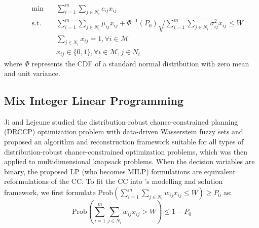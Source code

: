 \documentclass[lettersize,journal]{IEEEtran}
\begin{document}
\begin{subequations}
    \begin{align}
    & & \min \quad       &\sum\limits_{i=1}^m\sum\limits_{j\in N_i} c_{ij} x_{ij}    \\
    & & \text{s.t.}\quad &\sum\limits_{i=1}^m\sum\limits_{j\in N_i} \mu_{ij} x_{ij} + \Phi^{-1}(P_0)\sqrt{\sum\limits_{i=1}^m\sum\limits_{j\in N_i} \sigma^2_{ij} x_{ij}}\leq W\\
    & &                  &\sum\limits_{j\in N_i}x_{ij}=1, \forall i \in \mathcal{M}\\
    & &                  &x_{ij}\in \{0,1\},\forall i \in \mathcal{M}, j\in N_i 
    \end{align}
    \label{formu_RAMCKP}
\end{subequations}
where $\Phi$ represents the CDF of a standard normal distribution with zero mean and unit variance.

\subsection{Mix Integer Linear Programming}
Ji and Lejeune \cite{ji2021data} studied the distribution-robust chance-constrained planning (DRCCP) optimization problem with data-driven Wasserstein fuzzy sets and proposed an algorithm and reconstruction framework suitable for all types of distribution-robust chance-constrained optimization problems, which was then applied to multidimensional knapsack problems. 
When the decision variables are binary, the proposed LP (who becomes MILP) formulations are equivalent reformulations of the CC. 
To fit the CC into \cite{ji2021data}'s modelling and solution framework, we first formulate $\text{Prob}(\sum\limits_{i=1}^m\sum\limits_{j\in N_i} w_{ij} x_{ij}\leq W)\geq P_0$ as:
\begin{equation}\label{appe:ap.1}
    \text{Prob}(\sum\limits_{i=1}^m\sum\limits_{j\in N_i} w_{ij} x_{ij} > W)\leq 1-P_0
\end{equation}
\end{document}
